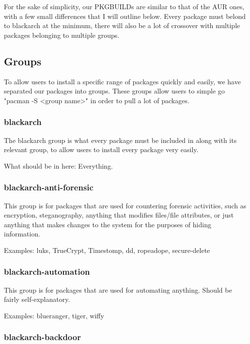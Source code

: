 \documentclass[a4paper, oneside, 11pt]{book}
\begin{document}
For the sake of simplicity, our PKGBUILDs are similar to that of the AUR ones, with a few small differences that I will outline below. Every package must belond to blackarch at the minimum, there will also be a lot of crossover with multiple packages belonging to multiple groups.

\subsection{Groups}

To allow users to install a specific range of packages quickly and easily, we have separated our packages into groups. These groups allow users to simple go "pacman -S <group name>" in order to pull a lot of packages.

\subsubsection{blackarch}

The blackarch group is what every package must be included in along with its relevant group, to allow users to install every package very easily.

What should be in here: Everything.

\subsubsection{blackarch-anti-forensic}

This group is for packages that are used for countering forensic activities, such as encryption, steganography, anything that modifies files/file attributes, or just anything that makes changes to the system for the purposes of hiding information.

Examples: luks, TrueCrypt, Timestomp, dd, ropeadope, secure-delete

\subsubsection{blackarch-automation}

This group is for packages that are used for automating anything. Should be fairly self-explanatory.

Examples: blueranger, tiger, wiffy

\subsubsection{blackarch-backdoor}
\end{document}
